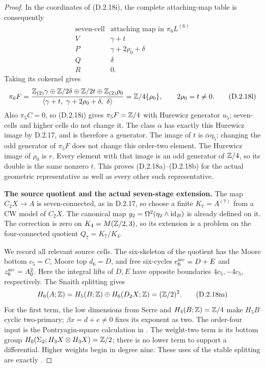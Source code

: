 \begin{proof}
In the coordinates of \textup{(D.2.18i)}, the complete
attaching-map table is consequently
\[
\begin{array}{c|c}
 \text{seven-cell}&\text{attaching map in }\pi_6L^{(6)}\\ \hline
 V&\gamma+t\\
 P&\gamma+2\rho_0+\delta\\
 Q&\delta\\
 R&0.
\end{array}
 \tag{D.2.18k}
\]
Taking its cokernel gives
\[
 \pi_6F=
 \frac{\mathbb Z_{(2)}\gamma\oplus\mathbb Z/2\delta
       \oplus\mathbb Z/2t\oplus\mathbb Z_{(2)}\rho_0}
      {\langle\gamma+t,\ \gamma+2\rho_0+\delta,\ \delta\rangle}
 =\mathbb Z/4\{\rho_0\},\qquad 2\rho_0=t\ne0.
 \tag{D.2.18l}
\]
Also $\pi_5C=0$, so \textup{(D.2.18i)} gives
$\pi_5F=\mathbb Z/4$ with Hurewicz generator $u_5$; seven-cells
and higher cells do not change it. The class
$\overline\alpha$ has exactly this Hurewicz image by D.2.17,
and is therefore a generator. The image of $t$ is
$\overline\alpha\eta_5$; changing the odd generator of
$\pi_5F$ does not change this order-two element.
The Hurewicz image of $\rho_0$ is $r$. Every element with
that image is an odd generator of $\mathbb Z/4$, so its double
is the same nonzero $t$. This proves
\textup{(D.2.18a)--(D.2.18b)} for the actual geometric
representative as well as every other such representative.

\medskip\noindent
\textbf{The source quotient and the actual seven-stage extension.}
The map $C_2X\to A$ is seven-connected, as in D.2.17,
so choose a finite $K_7=A^{(7)}$ from a CW model of $C_2X$.
The canonical map $g_2=\Omega^2(\eta_2\wedge\mathrm{id}_B)$ is
already defined on it. The correction is zero on
$K_4=M(\mathbb Z/2,3)$, so its extension is a problem on the
four-connected quotient $Q_7=K_7/K_4$.

We record all relevant source cells. The six-skeleton of
the quotient has the Moore bottom $c_5=C$, Moore top
$d_6=D$, and free six-cycles
$e_6^{\rm src}=D+E$ and $z_6^{\rm src}=A_0^2$.
Here the integral lifts of $D,E$ have opposite boundaries
$4c_5,-4c_5$, respectively. The Snaith splitting gives
\[
 H_6(A;\mathbb Z)=H_5(B;\mathbb Z)\oplus
 H_6(D_2X;\mathbb Z)=(\mathbb Z/2)^2.
 \tag{D.2.18m}
\]
For the first term, the low dimensions from Serre and
$H_4(B;\mathbb Z)=\mathbb Z/4$ make $H_5B$ cyclic two-primary;
$\beta x=d+e\ne0$ fixes its exponent as two. The
order-four input is the Pontryagin-square calculation in
\cite[\S2.3 and proof of Lemma~6.1]{I_Mahowald1964}.
The weight-two term is its bottom group
$H_0(\Sigma_2;H_3X\otimes H_3X)=\mathbb Z/2$; there is no
lower term to support a differential. Higher weights begin
in degree nine. These uses of the stable splitting are
exactly \cite[Theorem~1.1 and \S2]{Snaith1974}.


\end{proof}
